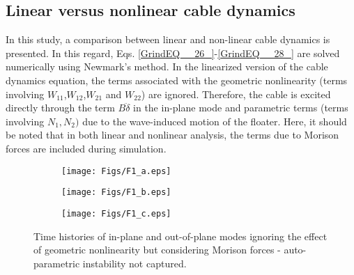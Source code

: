 \documentclass[review]{elsarticle}
\begin{document}
\subsection{Linear versus nonlinear cable dynamics}
In this study, a comparison between linear and non-linear cable dynamics is presented. In this regard, Eqs. \eqref{GrindEQ__26_}-\eqref{GrindEQ__28_} are solved numerically using Newmark's method.  In the linearized version of the cable dynamics equation, the terms associated with the geometric nonlinearity (terms involving $W_{11}$,$W_{12}$,$W_{21}$ and $W_{22}$) are ignored. Therefore, the cable is excited directly through the term $B\ddot{\delta }$ in the in-plane mode and parametric terms (terms involving $N_1, N_2)$ due to the wave-induced motion of the floater. Here, it should be noted that in both linear and nonlinear analysis, the terms due to Morison forces are included during simulation.
\begin{figure}
	\centering
	\begin{subfigure}{1.0\textwidth}
		\centering
		\texttt{[image: Figs/F1\_a.eps]}
		\caption{}
	\end{subfigure}
	\begin{subfigure}{1.0\textwidth}
		\centering
		\texttt{[image: Figs/F1\_b.eps]}
		\caption{}
	\end{subfigure}
	\begin{subfigure}{1.0\textwidth}
		\centering
		\texttt{[image: Figs/F1\_c.eps]}
		\caption{}
	\end{subfigure}
	\caption{Time histories of in-plane and out-of-plane modes ignoring the effect of geometric nonlinearity but considering Morison forces - auto-parametric instability not captured.}
	\label{lcd}
\end{figure}
\end{document}
